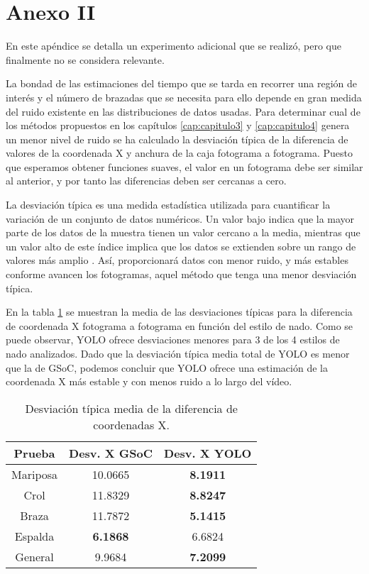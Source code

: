 \chapter*{Anexo II} \label{anexo2}

En este apéndice se detalla un experimento adicional que se realizó, pero que finalmente no se considera relevante.

La bondad de las estimaciones del tiempo que se tarda en recorrer una región de interés y el número de brazadas que se necesita para ello depende en gran medida del ruido existente en las distribuciones de datos usadas. Para determinar cual de los métodos propuestos en los capítulos \ref{cap:capitulo3} y \ref{cap:capitulo4} genera un menor nivel de ruido se ha calculado la desviación típica de la diferencia de valores de la coordenada X y anchura de la caja fotograma a fotograma. Puesto que esperamos obtener funciones suaves, el valor en un fotograma debe ser similar al anterior, y por tanto las diferencias deben ser cercanas a cero.

La desviación típica es una medida estadística utilizada para cuantificar la variación de un conjunto de datos numéricos. Un valor bajo indica que la mayor parte de los datos de la muestra tienen un valor cercano a la media, mientras que un valor alto de este índice implica que los datos se extienden sobre un rango de valores más amplio \cite{estadistica}. Así, proporcionará datos con menor ruido, y más estables conforme avancen los fotogramas, aquel método que tenga una menor desviación típica. 

En la tabla \ref{tab:desviaciondiferenciasX} se muestran la media de las desviaciones típicas para la diferencia de coordenada X fotograma a fotograma en función del estilo de nado. Como se puede observar, YOLO ofrece desviaciones menores para 3 de los 4 estilos de nado analizados. Dado que la desviación típica media total de YOLO es menor que la de GSoC, podemos concluir que YOLO ofrece una estimación de la coordenada X más estable y con menos ruido a lo largo del vídeo.

\begin{table}[]
    \centering
    \small
    \begin{tabular}{| c | c | c |   } \hline
        Prueba & Desv. X GSoC & Desv. X YOLO   \\ \hline
         Mariposa & 10.0665 & \textbf{8.1911} \\
         Crol & 11.8329 & \textbf{8.8247} \\
         Braza & 11.7872 & \textbf{5.1415} \\  
         Espalda & \textbf{6.1868} & 6.6824 \\ 
         General & 9.9684 & \textbf{7.2099} \\ \hline
    \end{tabular}
    \caption{Desviación típica media de la diferencia de coordenadas X.} 
    \label{tab:desviaciondiferenciasX}
\end{table}

